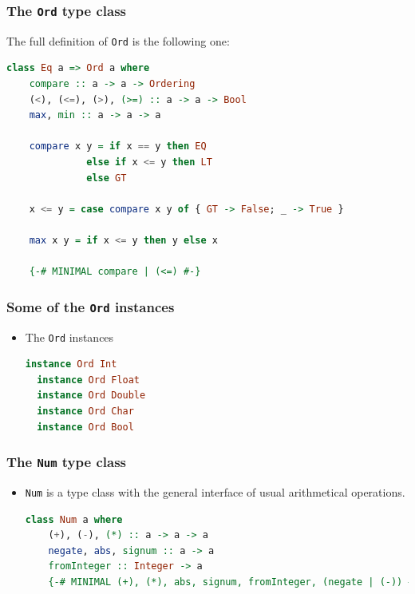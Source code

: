 \documentclass[10pt,pdf,utf8,russian,aspectratio=169]{beamer}
\begin{document}
\begin{frame}[fragile]
  \frametitle{The \verb"Ord" type class}

The full definition of \verb"Ord" is the following one:

  \begin{lstlisting}[language=Haskell]
  class Eq a => Ord a where
    compare :: a -> a -> Ordering
    (<), (<=), (>), (>=) :: a -> a -> Bool
    max, min :: a -> a -> a

    compare x y = if x == y then EQ
              else if x <= y then LT
              else GT

    x <= y = case compare x y of { GT -> False; _ -> True }

    max x y = if x <= y then y else x

    {-# MINIMAL compare | (<=) #-}
  \end{lstlisting}
\end{frame}

\begin{frame}[fragile]
  \frametitle{Some of the \verb"Ord" instances}

\begin{itemize}
  \item The \verb"Ord" instances
\begin{lstlisting}[language=Haskell]
  instance Ord Int
  instance Ord Float
  instance Ord Double
  instance Ord Char
  instance Ord Bool
\end{lstlisting}
\end{itemize}
\end{frame}

\begin{frame}[fragile]
  \frametitle{The \verb"Num" type class}

\begin{itemize}
  \item \verb"Num" is a type class with the general interface of usual arithmetical operations.
  \begin{lstlisting}[language=Haskell]
  class Num a where
    (+), (-), (*) :: a -> a -> a
    negate, abs, signum :: a -> a
    fromInteger :: Integer -> a
    {-# MINIMAL (+), (*), abs, signum, fromInteger, (negate | (-)) #-}
  \end{lstlisting}
   
\end{itemize}
\end{frame}
\end{document}
